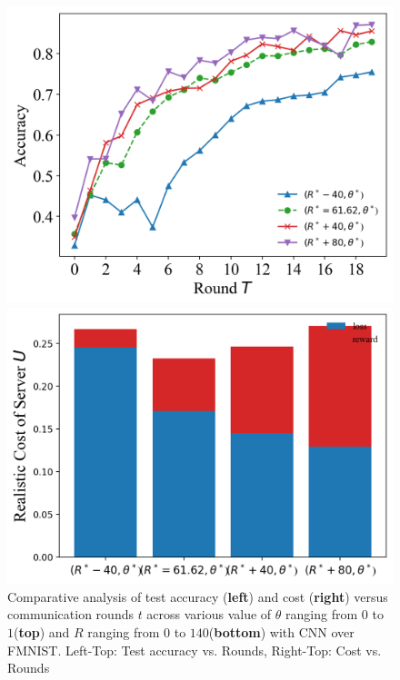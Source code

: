 \documentclass{article}
\theoremstyle{plain}
\theoremstyle{definition}
\theoremstyle{remark}
\begin{document}
\begin{figure}
\begin{minipage}{0.49\linewidth}
		\centerline{\includegraphics[width=\textwidth]{figures/figure_74_B.png}}
	\end{minipage}
	\begin{minipage}{0.49\linewidth}
		\centerline{\includegraphics[width=\textwidth]{figures/figure_75_B.png}}
	\end{minipage}
	\caption{Comparative analysis of test accuracy (\textbf{left}) and cost (\textbf{right}) versus communication rounds $t$ across various value of $\theta$ ranging from $0$ to $1$(\textbf{top}) and $R$ ranging from $0$ to $140$(\textbf{bottom}) with CNN over FMNIST. Left-Top: Test accuracy vs. Rounds, Right-Top: Cost vs. Rounds}
  \label{fig:server_cost_fmnist}
\end{figure}
\end{document}
